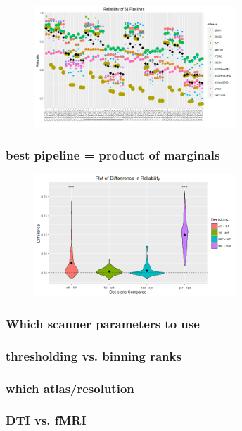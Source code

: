 \documentclass{article}
\begin{document}
\begin{figure}[t!]
\includegraphics[width=3.0in]{../Figs/64_pipelines_gg.png}
\caption{}
\label{fig:64}
\end{figure}


\subsubsection{best pipeline = product of marginals}


\begin{figure}[t!]
\includegraphics[width=3.0in]{../Figs/Differ_violin_mean.png}
\caption{}
\label{fig:64}
\end{figure}

\subsubsection{Which scanner parameters to use}


\subsubsection{thresholding vs. binning ranks}

\subsubsection{which atlas/resolution}


\subsubsection{DTI vs. fMRI}
\end{document}
